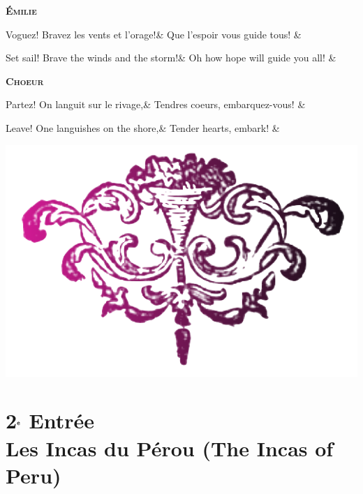 \documentclass{article}
\newcommand{\accentcolr}{\color{WildStrawberry}}
\newcommand{\spotcolr}[1]{{\accentcolr#1}}
\newcommand{\secheadr}[1]{\rhead{\parbox{\marginparwidth}{\sffamily\spotcolr{#1}}}\cfoot{\thepage\hspace{\marginparwidth}\hspace{\marginparsep}}\thispagestyle{plain}}
\newcommand{\dialogue}[1]{%
    \filbreak\begin{center}
	    \textbf{\textsc{#1}}
    \end{center}\nopagebreak}
\begin{document}
\dialogue{\'{E}milie}
\begin{pairs}
\begin{Leftside}
	\stanza
        Voguez! Bravez les vents et l'orage!&
		Que l'espoir vous guide tous!
    \& 
    \endnumbering
\end{Leftside}
\begin{Rightside}
	\stanza
	    Set sail! Brave the winds and the storm!&
		Oh how hope will guide you all!
    \& 
    \endnumbering
\end{Rightside} 
\Columns 
\end{pairs}

\dialogue{Choeur}
\begin{pairs}
\begin{Leftside}
	\stanza
		Partez! On languit sur le rivage,&
		Tendres coeurs, embarquez-vous!
    \& 
    \endnumbering
\end{Leftside}
\begin{Rightside}
	\stanza
		Leave! One languishes on the shore,&
		Tender hearts, embark!
    \& 
    \endnumbering
\end{Rightside} 
\Columns 
\end{pairs}


\vfill
\begin{center}
\includegraphics[width=.25\textwidth]{flourish2.png}
\end{center}
\vfill




\newpage

\section*{2$^{\textrm{\sffamily{e}}}$ Entr\'{e}e \\ Les Incas du P\'{e}rou (The Incas of Peru)}\secheadr{Act 2}
\end{document}
